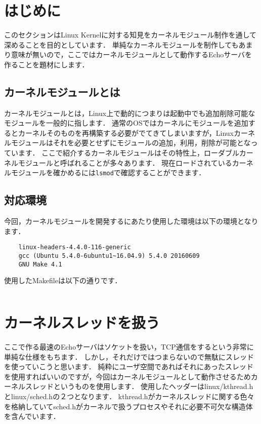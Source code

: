 \section{はじめに}
このセクションはLinux Kernelに対する知見をカーネルモジュール制作を通して深めることを目的としています．
単純なカーネルモジュールを制作してもあまり意味が無いので，ここではカーネルモジュールとして動作するEchoサーバを作ることを題材にします．

\subsection{カーネルモジュールとは}
カーネルモジュールとは，Linux上で動的につまりは起動中でも追加削除可能なモジュールを一般的に指します．
通常のOSではカーネルにモジュールを追加するとカーネルそのものを再構築する必要がでてきてしまいますが，Linuxカーネルモジュールはそれを必要とせずにモジュールの追加，利用，削除が可能となっています．
ここで紹介するカーネルモジュールはその特性上，ローダブルカーネルモジュールと呼ばれることが多々あります．
現在ロードされているカーネルモジュールを確かめるには\texttt{lsmod}で確認することができます．

\subsection{対応環境}
今回，カーネルモジュールを開発するにあたり使用した環境は以下の環境となります．
\begin{verbatim}
    linux-headers-4.4.0-116-generic
    gcc (Ubuntu 5.4.0-6ubuntu1~16.04.9) 5.4.0 20160609
    GNU Make 4.1
\end{verbatim}

使用したMakefileは以下の通りです．
\inputminted[frame=lines,framesep=2mm,baselinestretch=1.2,fontsize=\footnotesize,linenos,breaklines]{bash}{\lrfasset/Makefile}

\section{カーネルスレッドを扱う}
ここで作る最速のEchoサーバはソケットを扱い，TCP通信をするという非常に単純な仕様をもちます．
しかし，それだけではつまらないので無駄にスレッドを使っていこうと思います．
純粋にユーザ空間であればそれにあったスレッドを使用すればいいのですが，今回はカーネルモジュールとして動作させるためカーネルスレッドというものを使用します．
使用したヘッダーはlinux/kthread.hとlinux/sched.hの２つとなります．
kthread.hがカーネルスレッドに関する色々を格納していてsched.hがカーネルで扱うプロセスやそれに必要不可欠な構造体を含んでいます．

